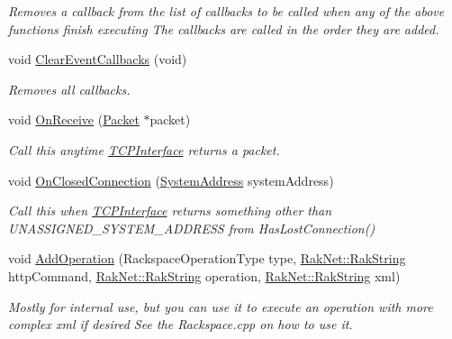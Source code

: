 \begin{DoxyCompactItemize}
\begin{DoxyCompactList}\small\item\em Removes a callback from the list of callbacks to be called when any of the above functions finish executing The callbacks are called in the order they are added. \end{DoxyCompactList}\item 
\hypertarget{class_rak_net_1_1_rackspace_aeed723cacf1585518e95457ca31df30f}{void \hyperlink{class_rak_net_1_1_rackspace_aeed723cacf1585518e95457ca31df30f}{Clear\-Event\-Callbacks} (void)}\label{class_rak_net_1_1_rackspace_aeed723cacf1585518e95457ca31df30f}

\begin{DoxyCompactList}\small\item\em Removes all callbacks. \end{DoxyCompactList}\item 
\hypertarget{class_rak_net_1_1_rackspace_a524db08379166c1693ebe90bc38e36f7}{void \hyperlink{class_rak_net_1_1_rackspace_a524db08379166c1693ebe90bc38e36f7}{On\-Receive} (\hyperlink{struct_rak_net_1_1_packet}{Packet} $\ast$packet)}\label{class_rak_net_1_1_rackspace_a524db08379166c1693ebe90bc38e36f7}

\begin{DoxyCompactList}\small\item\em Call this anytime \hyperlink{class_rak_net_1_1_t_c_p_interface}{T\-C\-P\-Interface} returns a packet. \end{DoxyCompactList}\item 
\hypertarget{class_rak_net_1_1_rackspace_a7535ff8bed3bd2e7234dcaf11f99f197}{void \hyperlink{class_rak_net_1_1_rackspace_a7535ff8bed3bd2e7234dcaf11f99f197}{On\-Closed\-Connection} (\hyperlink{struct_rak_net_1_1_system_address}{System\-Address} system\-Address)}\label{class_rak_net_1_1_rackspace_a7535ff8bed3bd2e7234dcaf11f99f197}

\begin{DoxyCompactList}\small\item\em Call this when \hyperlink{class_rak_net_1_1_t_c_p_interface}{T\-C\-P\-Interface} returns something other than U\-N\-A\-S\-S\-I\-G\-N\-E\-D\-\_\-\-S\-Y\-S\-T\-E\-M\-\_\-\-A\-D\-D\-R\-E\-S\-S from Has\-Lost\-Connection() \end{DoxyCompactList}\item 
\hypertarget{class_rak_net_1_1_rackspace_a854189af1a23f947008d966409bd5876}{void \hyperlink{class_rak_net_1_1_rackspace_a854189af1a23f947008d966409bd5876}{Add\-Operation} (Rackspace\-Operation\-Type type, \hyperlink{class_rak_net_1_1_rak_string}{Rak\-Net\-::\-Rak\-String} http\-Command, \hyperlink{class_rak_net_1_1_rak_string}{Rak\-Net\-::\-Rak\-String} operation, \hyperlink{class_rak_net_1_1_rak_string}{Rak\-Net\-::\-Rak\-String} xml)}\label{class_rak_net_1_1_rackspace_a854189af1a23f947008d966409bd5876}

\begin{DoxyCompactList}\small\item\em Mostly for internal use, but you can use it to execute an operation with more complex xml if desired See the Rackspace.\-cpp on how to use it. \end{DoxyCompactList}\end{DoxyCompactItemize}
